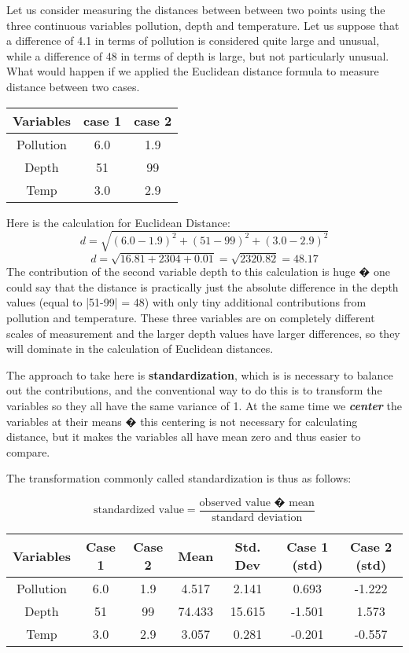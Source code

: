 \documentclass[12pt]{article}
\begin{document}
Let us consider measuring the distances between between two points using
the three continuous variables pollution, depth and temperature. Let us suppose that a difference of 4.1 in terms of pollution is considered quite large and unusual, while a difference of 48 in terms of depth is large, but not particularly unusual.
What would happen if we applied the Euclidean distance formula to measure distance between two cases.
\begin{center}
\begin{tabular}{|c|c|c|}
  \hline
Variables & case 1 & case 2 \\ \hline 
Pollution & 6.0 & 1.9 \\
Depth & 51 & 99 \\
Temp & 3.0 & 2.9 \\
  \hline
\end{tabular}
\end{center}

Here is the calculation for Euclidean Distance:
\[ d = \sqrt{(6.0 - 1.9)^2 + (51 - 99)^2 + (3.0 - 2.9)^2}   \]
 \[ d = \sqrt{16.81 + 2304 + 0.01} = \sqrt{2320.82} = 48.17 \]
\noindent The contribution of the second variable depth to this calculation is huge � one could say
that the distance is practically just the absolute difference in the depth values (equal to
|51-99| = 48) with only tiny additional contributions from pollution and temperature. These three variables are on
completely different scales of measurement and the larger depth values have larger differences, so they will dominate in the calculation of Euclidean distances.

\noindent The approach to take here is \textbf{standardization}, which is is necessary to balance out the contributions, and the
conventional way to do this is to transform the variables so they all have the same variance
of 1. At the same time we \textbf{\textit{center}} the variables at their means � this centering is not
necessary for calculating distance, but it makes the variables all have mean zero and thus
easier to compare. 

\noindent The transformation commonly called standardization is thus as follows:

\[\mbox{standardized value} = \frac{\mbox{observed value � mean}}{ \mbox{standard deviation}}\]
\begin{center}
\begin{tabular}{|c|c|c|c|c|c|c|}
  \hline
Variables & Case 1 & Case 2 & Mean & Std. Dev & Case 1 (std) & Case 2 (std) \\ \hline
Pollution & 6.0 & 1.9 & 4.517	&	2.141	&	0.693	&	-1.222	\\
Depth & 51 & 99 & 74.433	&	15.615	&	-1.501	&	1.573	\\
Temp & 3.0 & 2.9 & 3.057	&	0.281	&	-0.201	&	-0.557	\\
  \hline
\end{tabular}
\end{center}
\end{document}
